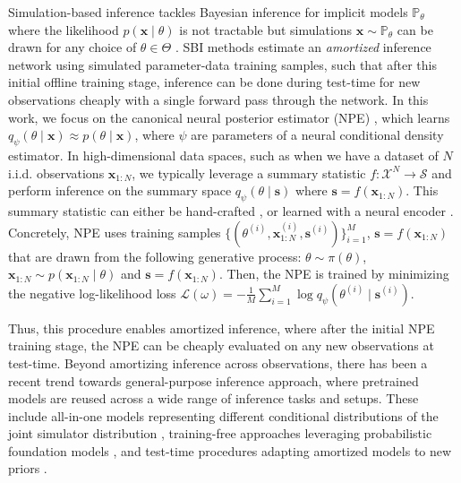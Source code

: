 \documentclass{article}
\theoremstyle{plain}
\theoremstyle{definition}
\theoremstyle{remark}
\begin{document}
Simulation-based inference tackles Bayesian inference for implicit models \( \mathbb{P}_\theta \) where the likelihood \( p(\mathbf{x} \mid \theta) \) is not tractable but simulations \( \mathbf{x} \sim \mathbb{P}_\theta \) can be drawn for any choice of \( \theta \in \Theta \) \citep{cranmer2015approximating}. SBI methods estimate an \emph{amortized} inference network using simulated parameter-data training samples, such that after this initial offline training stage, inference can be done during test-time for new observations cheaply with a single forward pass through the network. In this work, we focus on the canonical neural posterior estimator (NPE) \citep{papamakariosFastEpsilonFree2016}, which learns \( q_\psi(\theta \mid \mathbf{x}) \approx p( \theta \mid \mathbf{x} ) \), where \( \psi \) are parameters of a neural conditional density estimator. In high-dimensional data spaces, such as when we have a dataset of \( N \) i.i.d. observations \( \mathbf{x}_{1:N} \), we typically leverage a summary statistic \( f : \mathcal{X}^N \to \mathcal{S} \) and perform inference on the summary space \( q_\psi(\theta \mid \mathbf{s}) \) where \( \mathbf{s} = f(\mathbf{x}_{1:N}) \). This summary statistic can either be hand-crafted \citep{fearnheadConstructingSummaryStatistics2012}, or learned with a neural encoder \citep{chen2020neural}. Concretely, NPE uses training samples \( \{ (\theta^{(i)}, \mathbf{x}_{1:N}^{(i)}, \mathbf{s}^{(i)}) \}_{i=1}^M \), \( \mathbf{s} = f(\mathbf{x}_{1:N}) \) that are drawn from the following generative process: \( \theta \sim \pi(\theta) \), \( \mathbf{x}_{1:N} \sim p(\mathbf{x}_{1:N} \mid \theta) \) and \( \mathbf{s} = f(\mathbf{x}_{1:N}) \). Then, the NPE is trained by minimizing the negative log-likelihood loss \( \mathcal{L}(\omega) = - \frac{1}{M} \sum_{i=1}^M \log q_\psi(\theta^{(i)} \mid \mathbf{s}^{(i)}) \). 

Thus, this procedure enables amortized inference, where after the initial NPE training stage, the NPE can be cheaply evaluated on any new observations at test-time. Beyond amortizing inference across observations, there has been a recent trend towards general-purpose inference approach, where pretrained models are reused across a wide range of inference tasks and setups. These include all-in-one models representing different conditional distributions of the joint simulator distribution \citep{gloecklerAllinoneSimulationbasedInference2024f}, training-free approaches \citep{vetterEffortlessSimulationEfficientBayesian2025b} leveraging probabilistic foundation models \citep{mullerPositionFutureBayesian2025a}, and test-time procedures adapting amortized models to new priors \citep{yangPriorGuideTestTimePrior2025}.
\end{document}
